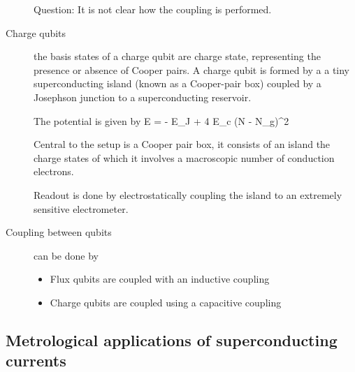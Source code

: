 \begin{description}
Question: It is not clear how the coupling is performed. 

\item[Charge qubits] the basis states of a charge qubit are charge state, representing the presence or absence of Cooper pairs. A charge qubit is formed by a a tiny superconducting island (known as a Cooper-pair box) coupled by a Josephson junction to a superconducting reservoir. 

The potential is given by 
\beq
E = - E_J \cos{\phi}   + 4 E_c (N - N_g)^2
\eeq

Central to the setup is a Cooper pair box, it consists of an island the charge states of which it involves a macroscopic number of conduction electrons. 

Readout is done by electrostatically coupling the island to an extremely sensitive electrometer. 

\item[Coupling between qubits]  can be done by
\begin{itemize}
\item Flux qubits are coupled with an inductive coupling
\item Charge qubits are coupled using a capacitive coupling
\end{itemize}

\end{description}

\subsection{Metrological applications of superconducting currents}

